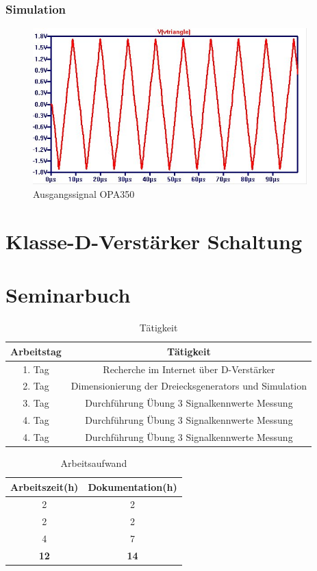 \documentclass[11pt,a4paper,bibtotoc,oneside]{scrbook}
\begin{document}
\subsection{Simulation}
\begin{figure}[h]
\centering
    \includegraphics[width=300pt]{./picture/OPA350_triangle.png}
    \caption{\label{opa324}Ausgangssignal OPA350}
\end{figure}
\chapter{Klasse-D-Verstärker Schaltung}


\chapter{Seminarbuch}
\begin{table}[htbp]
  \centering
  \captionsetup{margin=1pt,font=small,labelfont=bf}
  \caption{Tätigkeit}
    \begin{tabular}{| c | c| }\hline
    {\bf Arbeitstag} &{\bf Tätigkeit} \\\hline
    \hline
    1. Tag   & Recherche im Internet über D-Verstärker  \\
    2. Tag   & Dimensionierung der Dreiecksgenerators und Simulation \\
    3. Tag   & Durchführung Übung 3 Signalkennwerte Messung  \\
    4. Tag   & Durchführung Übung 3 Signalkennwerte Messung  \\
    4. Tag   & Durchführung Übung 3 Signalkennwerte Messung  \\
    \hline
    \end{tabular}%
  \label{tab:addlabel}%
\end{table}%
\begin{table}[htbp]
  \centering
    \captionsetup{margin=1pt,font=small,labelfont=bf}
      \caption{Arbeitsaufwand}
      \begin{tabular}{| c | c |}\hline
      {\bf Arbeitszeit(h)} &{\bf Dokumentation(h)} \\\hline
      \hline
        2   & 2 \\
        2   & 2 \\
        4   & 7 \\
      \hline
        \textbf{12}   & \textbf{14} \\
      \hline
      \end{tabular}%
    \label{tab:addlabel}%
\end{table}%
\end{document}
